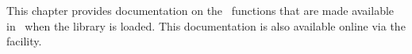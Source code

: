 \label{chap:ref}
This chapter provides documentation on the \ML\ functions that are made
available in \HOL\ when the  library is loaded. This documentation
is also available online via the  facility.
